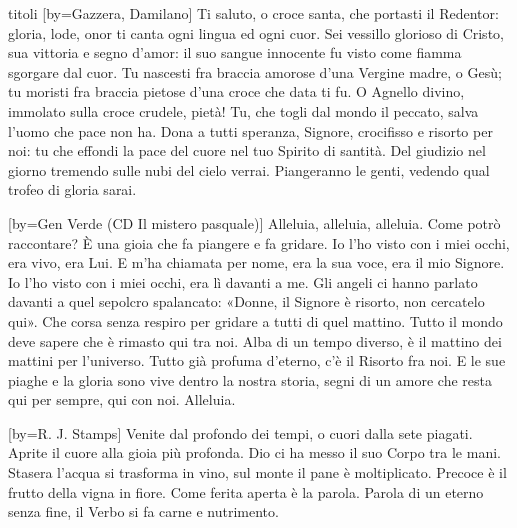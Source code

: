 \begin{songs}{titoli}
[by={Gazzera, Damilano}]
\beginchorus
Ti saluto, o croce santa, che portasti il Redentor:
gloria, lode, onor ti canta ogni lingua ed ogni cuor.
\endchorus
\beginverse
Sei vessillo glorioso di Cristo, sua vittoria e segno d'amor:
il suo sangue innocente fu visto come fiamma sgorgare dal cuor.
\endverse
\beginverse
Tu nascesti fra braccia amorose d'una Vergine madre, o Gesù;
tu moristi fra braccia pietose d'una croce che data ti fu.
\endverse
\beginverse
O Agnello divino, immolato sulla croce crudele, pietà!
Tu, che togli dal mondo il peccato, salva l'uomo che pace non ha.
\endverse
\beginverse
Dona a tutti speranza, Signore, crocifisso e risorto per noi:
tu che effondi la pace del cuore nel tuo Spirito di santità.
\endverse
\beginverse
Del giudizio nel giorno tremendo sulle nubi del cielo verrai.
Piangeranno le genti, vedendo qual trofeo di gloria sarai.
\endverse
\endsong

[by={Gen Verde (CD Il mistero pasquale)}]
\beginchorus
Alleluia, alleluia, alleluia. 
\endchorus
\beginverse
Come potrò raccontare?
È una gioia che fa piangere e fa gridare.
Io l'ho visto con i miei occhi,
era vivo, era Lui.
E m'ha chiamata per nome,
era la sua voce, era il mio Signore.
Io l'ho visto con i miei occhi,
era lì davanti a me.
\endverse
\beginverse
Gli angeli ci hanno parlato
davanti a quel sepolcro spalancato:
«Donne, il Signore è risorto,
non cercatelo qui».
Che corsa senza respiro
per gridare a tutti di quel mattino.
Tutto il mondo deve sapere
che è rimasto qui tra noi.
\endverse
\beginverse
Alba di un tempo diverso,
è il mattino dei mattini per l'universo.
Tutto già profuma d'eterno,
c'è il Risorto fra noi.
E le sue piaghe e la gloria
sono vive dentro la nostra storia,
segni di un amore che resta
qui per sempre, qui con noi.
\endverse
\beginverse*
Alleluia.
\endverse
\endsong

[by={R. J. Stamps}]
\beginverse
Venite dal profondo dei tempi, o cuori dalla sete piagati.
Aprite il cuore alla gioia più profonda.
\endverse
\beginchorus
Dio ci ha messo il suo Corpo tra le mani. 
\endchorus
\beginverse
Stasera l'acqua si trasforma in vino, sul monte il pane è moltiplicato.
Precoce è il frutto della vigna in fiore.
\endverse
\beginverse
Come ferita aperta è la parola. Parola di un eterno senza fine,
il Verbo si fa carne e nutrimento.
\endverse
\endsong

\end{songs}
